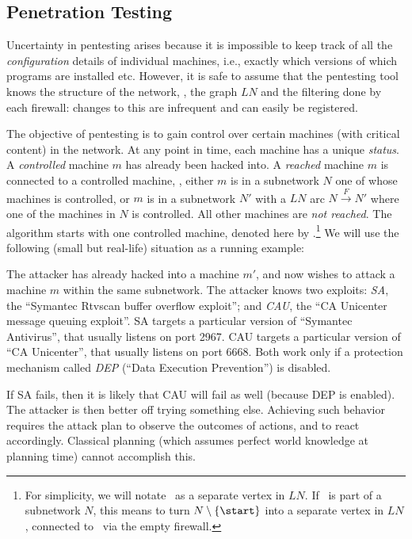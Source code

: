 \subsection{Penetration Testing}


Uncertainty in pentesting arises because it is impossible to keep
track of all the \emph{configuration} details of individual machines,
i.e., exactly which versions of which programs are installed
etc. However, it is safe to assume that the pentesting tool knows the
structure of the network, \ie, the graph $LN$ and the filtering done
by each firewall: changes to this are infrequent and can easily be
registered.


The objective of pentesting is to gain control over certain machines
(with critical content) in the network. At any point in time, each
machine has a unique {\em status}. A \emph{controlled} machine $m$ has
already been hacked into. A \emph{reached} machine $m$ is connected to
a controlled machine, \ie, either $m$ is in a subnetwork $N$ one of
whose machines is controlled, or $m$ is in a subnetwork $N'$ with a
$LN$ arc $N \xrightarrow{F} N'$ where one of the machines in $N$ is
controlled. All other machines are \emph{not reached}. The algorithm
starts with one controlled machine, denoted here by
\start.\footnote{For simplicity, we will notate \start\ as a separate
  vertex in $LN$.  If \start\ is part of a subnetwork $N$, this means
  to turn $N \setminus \{\start\}$ into a separate vertex in $LN$,
  connected to \start\ via the empty firewall.}
We will use the following (small but real-life) situation as a running
example:

\vspace{-0.05cm}
\begin{example}\label{exp:running-preliminaries}
The attacker has already hacked into a machine $m'$, and now wishes to
attack a machine $m$ within the same subnetwork. The attacker knows
two exploits: \emph{SA}, the ``Symantec Rtvscan buffer overflow
exploit''; and \emph{CAU}, the ``CA Unicenter message queuing
exploit''. SA targets a particular version of ``Symantec Antivirus'',
that usually listens on port 2967. CAU targets a particular version of
``CA Unicenter'', that usually listens on port 6668. Both work only if
a protection mechanism called \emph{DEP} (``Data Execution
Prevention'') is disabled.
\end{example}
\vspace{-0.05cm}

If SA fails, then it is likely that CAU will fail as well (because DEP
is enabled). The attacker is then better off trying something
else. Achieving such behavior requires the attack plan to observe the
outcomes of actions, and to react accordingly. Classical planning
(which assumes perfect world knowledge at planning time) cannot
accomplish this.  

